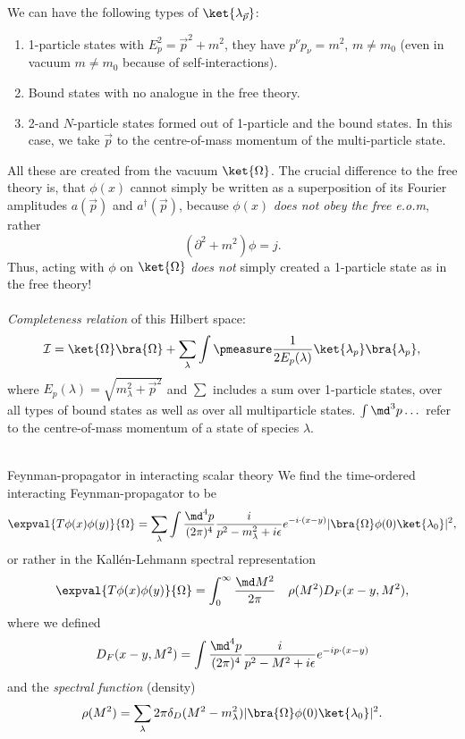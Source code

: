 We can have the following types of $\ket{\lambda_{\vec{p}}}$:
\begin{enumerate}
	\item 1-particle states with $E^2_p = \vec{p}^2+m^2$, they have $p^{\nu}p_{\nu}=m^2$, $m\neq m_0$ (even in vacuum $m \neq m_0$ because of self-interactions).
	\item Bound states with no analogue in the free theory.
	\item 2-and $N$-particle states formed out of 1-particle and the bound states. In this case, we take $\vec{p}$ to the centre-of-mass momentum of the multi-particle state.
\end{enumerate}
All these are created from the vacuum $\ket{\Omega}$. The crucial difference to the free theory is, that $ \phi(x)$ cannot simply be written as a superposition of its Fourier amplitudes $a(\vec{p})$ and $a^{\dagger}(\vec{p})$, because $\phi(x)$ \emph{does not obey the free e.o.m}, rather 
\begin{equation}
	(\partial^2+m^2)\phi = j.
\end{equation}
Thus, acting with  $\phi$ on $\ket{\Omega}$ \emph{does not} simply created a 1-particle state as in the free theory!
\\
\\
\emph{Completeness relation} of this Hilbert space:
\begin{equation}
	\mathcal{I}=\ket{\Omega}\bra{\Omega} + \sum_{\lambda} \int \pmeasure \frac{1}{2 E_p(\lambda)} \ket{\lambda_p} \bra{\lambda_p},
\end{equation}
where $E_p(\lambda)=\sqrt{m^2_{\lambda}+\vec{p}^2}$ and $\sum$ includes a sum over 1-particle states, over all types of bound states as well as over all multiparticle states. $\int \md^3 p \dots$ refer to the centre-of-mass momentum of a state of species $\lambda$.\\
\\
\begin{mybox}{Feynman-propagator in interacting scalar theory}
We find the time-ordered interacting Feynman-propagator to be
\begin{equation}
\expval{T\phi(x)\phi(y)}{\Omega} = \sum_{\lambda} \int \frac{\md^4 p}{(2 \pi)^4} \frac{i}{p^2-m^2_{\lambda} +i\epsilon} e^{- i \cdot (x-y)} |\bra{\Omega}\phi(0)\ket{\lambda_0}|^2,
\end{equation}
or rather in the Kallén-Lehmann spectral representation
\begin{equation}
	\expval{T\phi(x)\phi(y)}{\Omega} = \int_0^{\infty} \frac{\md M^2}{2 \pi} \quad \rho(M^2) D_F(x-y,M^2),
\end{equation}
where we defined
\begin{equation}
	D_F(x-y, M^2) = \int \frac{\md^4 p}{(2 \pi)^4} \frac{i}{p^2-M^2+i\epsilon} e^{-i p\cdot (x-y)} 
\end{equation}
and the \emph{spectral function} (density)
\begin{equation}
	\rho(M^2) = \sum_{\lambda} 2 \pi \delta_D(M^2-m^2_{\lambda}) |\bra{\Omega} \phi(0) \ket{\lambda_0}|^2.
\end{equation}
\end{mybox}
